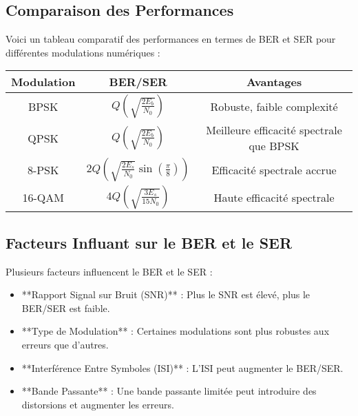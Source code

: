 \documentclass[10pt,a4paper]{article}
\begin{document}

\subsection*{Comparaison des Performances}
Voici un tableau comparatif des performances en termes de BER et SER pour différentes modulations numériques :

\begin{tabular}{|c|c|c|}
\hline
Modulation & BER/SER & Avantages \\
\hline
BPSK & \( Q\left(\sqrt{\frac{2E_b}{N_0}}\right) \) & Robuste, faible complexité \\
\hline
QPSK & \( Q\left(\sqrt{\frac{2E_b}{N_0}}\right) \) & Meilleure efficacité spectrale que BPSK \\
\hline
8-PSK & \( 2Q\left(\sqrt{\frac{2E_s}{N_0}} \sin\left(\frac{\pi}{8}\right)\right) \) & Efficacité spectrale accrue \\
\hline
16-QAM & \( 4Q\left(\sqrt{\frac{3E_s}{15N_0}}\right) \) & Haute efficacité spectrale \\
\hline
\end{tabular}

\subsection*{Facteurs Influant sur le BER et le SER}
Plusieurs facteurs influencent le BER et le SER :
\begin{itemize}
    \item **Rapport Signal sur Bruit (SNR)** : Plus le SNR est élevé, plus le BER/SER est faible.
    \item **Type de Modulation** : Certaines modulations sont plus robustes aux erreurs que d'autres.
    \item **Interférence Entre Symboles (ISI)** : L'ISI peut augmenter le BER/SER.
    \item **Bande Passante** : Une bande passante limitée peut introduire des distorsions et augmenter les erreurs.
\end{itemize}
\end{document}
